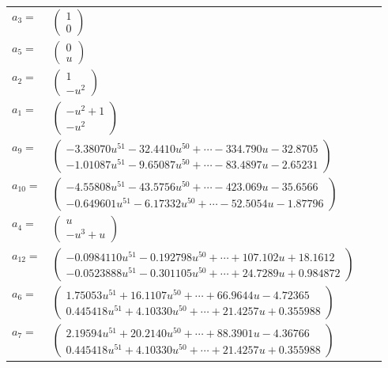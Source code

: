 \documentclass[1p]{elsarticle_modified}
\theoremstyle{definition}
\begin{document}
\begin{tabular}{m{7pt} m{180pt} m{7pt} m{180pt} }
\flushright $a_{3}=$&$\begin{pmatrix}1\\0\end{pmatrix}$ \\
\flushright $a_{5}=$&$\begin{pmatrix}0\\u\end{pmatrix}$ \\
\flushright $a_{2}=$&$\begin{pmatrix}1\\- u^2\end{pmatrix}$ \\
\flushright $a_{1}=$&$\begin{pmatrix}- u^2+1\\- u^2\end{pmatrix}$ \\
\flushright $a_{9}=$&$\begin{pmatrix}-3.38070 u^{51}-32.4410 u^{50}+\cdots-334.790 u-32.8705\\-1.01087 u^{51}-9.65087 u^{50}+\cdots-83.4897 u-2.65231\end{pmatrix}$ \\
\flushright $a_{10}=$&$\begin{pmatrix}-4.55808 u^{51}-43.5756 u^{50}+\cdots-423.069 u-35.6566\\-0.649601 u^{51}-6.17332 u^{50}+\cdots-52.5054 u-1.87796\end{pmatrix}$ \\
\flushright $a_{4}=$&$\begin{pmatrix}u\\- u^3+u\end{pmatrix}$ \\
\flushright $a_{12}=$&$\begin{pmatrix}-0.0984110 u^{51}-0.192798 u^{50}+\cdots+107.102 u+18.1612\\-0.0523888 u^{51}-0.301105 u^{50}+\cdots+24.7289 u+0.984872\end{pmatrix}$ \\
\flushright $a_{6}=$&$\begin{pmatrix}1.75053 u^{51}+16.1107 u^{50}+\cdots+66.9644 u-4.72365\\0.445418 u^{51}+4.10330 u^{50}+\cdots+21.4257 u+0.355988\end{pmatrix}$ \\
\flushright $a_{7}=$&$\begin{pmatrix}2.19594 u^{51}+20.2140 u^{50}+\cdots+88.3901 u-4.36766\\0.445418 u^{51}+4.10330 u^{50}+\cdots+21.4257 u+0.355988\end{pmatrix}$ \\

\end{tabular}
\end{document}
